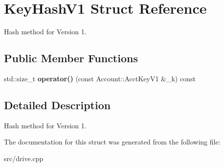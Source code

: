 \hypertarget{structKeyHashV1}{}\section{Key\+Hash\+V1 Struct Reference}
\label{structKeyHashV1}


Hash method for Version 1.  


\subsection*{Public Member Functions}
\begin{DoxyCompactItemize}
\item 
std\+::size\+\_\+t {\bfseries operator()} (const Account\+::\+Acct\+Key\+V1 \&\+\_\+k) const \hypertarget{structKeyHashV1_ae6c72a6e8ab5e2be4f9558bbb27605e3}{}\label{structKeyHashV1_ae6c72a6e8ab5e2be4f9558bbb27605e3}

\end{DoxyCompactItemize}


\subsection{Detailed Description}
Hash method for Version 1. 

The documentation for this struct was generated from the following file\+:\begin{DoxyCompactItemize}
\item 
src/drive.\+cpp\end{DoxyCompactItemize}

